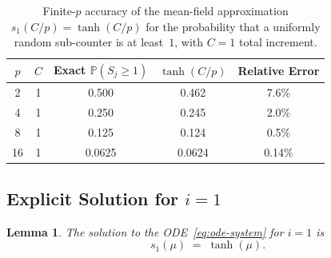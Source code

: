 \documentclass[11pt,a4paper]{article}
\newtheorem{lemma}[theorem]{Lemma}
\newcommand{\Prob}{\mathbb{P}}
\begin{document}
\begin{table}[h]
\centering
\begin{tabular}{ccccc}
\hline
$p$ & $C$ & Exact $\Prob(S_j \ge 1)$ & $\tanh(C/p)$ & Relative Error \\
\hline
2  & 1 & 0.500  & 0.462 & 7.6\% \\
4  & 1 & 0.250  & 0.245 & 2.0\% \\
8  & 1 & 0.125  & 0.124 & 0.5\% \\
16 & 1 & 0.0625 & 0.0624 & 0.14\% \\
\hline
\end{tabular}
\caption{Finite-$p$ accuracy of the mean-field approximation $s_1(C/p)
  = \tanh(C/p)$ for the probability that a uniformly random sub-counter is
  at least~$1$, with $C = 1$ total increment.}
\label{tab:finite-p}
\end{table}

\subsection{Explicit Solution for \texorpdfstring{$i=1$}{i=1}}
\label{ssec:tanh}

\begin{lemma}\label{lem:s1-tanh}
The solution to the ODE~\eqref{eq:ode-system} for $i = 1$ is
\begin{equation}\label{eq:s1-tanh}
  s_1(\mu) \;=\; \tanh(\mu).
\end{equation}
\end{lemma}
\end{document}
